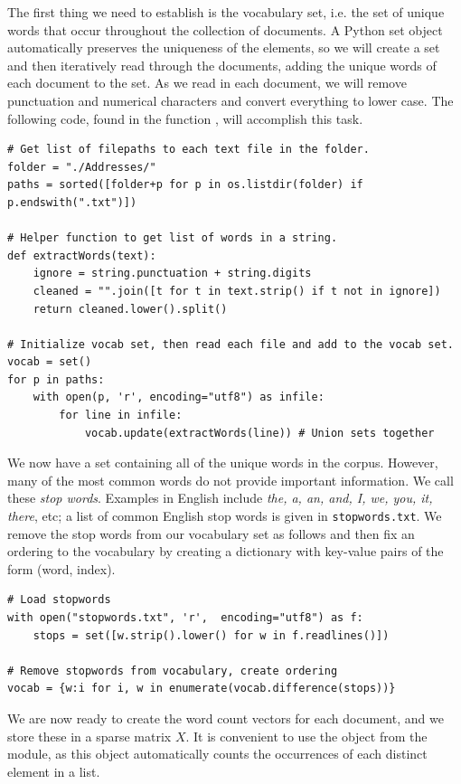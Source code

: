 The first thing we need to establish is the vocabulary set, i.e. the set of unique words that occur throughout the collection of documents.
A Python set object automatically preserves the uniqueness of the elements, so we will create a set and then iteratively read through the documents, adding the unique words of each document to the set.
As we read in each document, we will remove punctuation and numerical characters and convert everything to lower case.
The following code, found in the function , will accomplish this task.

\begin{lstlisting}
# Get list of filepaths to each text file in the folder.
folder = "./Addresses/"
paths = sorted([folder+p for p in os.listdir(folder) if p.endswith(".txt")])

# Helper function to get list of words in a string.
def extractWords(text):
    ignore = string.punctuation + string.digits
    cleaned = "".join([t for t in text.strip() if t not in ignore])
    return cleaned.lower().split()

# Initialize vocab set, then read each file and add to the vocab set.
vocab = set()
for p in paths:
    with open(p, 'r', encoding="utf8") as infile:
        for line in infile:
            vocab.update(extractWords(line)) # Union sets together
\end{lstlisting}

We now have a set containing all of the unique words in the corpus.
However, many of the most common words do not provide important information.
We call these \emph{stop words}. Examples in English include \emph{the, a, an, and, I, we, you, it, there}, etc; a list of common English stop words is given in \texttt{stopwords.txt}.
We remove the stop words from our vocabulary set as follows and then fix an ordering to the vocabulary by creating a dictionary
with key-value pairs of the form (word, index).

\begin{lstlisting}
# Load stopwords
with open("stopwords.txt", 'r',  encoding="utf8") as f:
    stops = set([w.strip().lower() for w in f.readlines()])

# Remove stopwords from vocabulary, create ordering
vocab = {w:i for i, w in enumerate(vocab.difference(stops))}
\end{lstlisting}

We are now ready to create the word count vectors for each document, and we store these in a sparse matrix $X$.
It is convenient to use the  object from the  module, as this object automatically counts the occurrences of each distinct element in a list.

